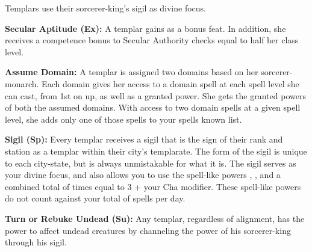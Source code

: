Templars use their sorcerer-king's sigil as divine focus.

\textbf{Secular Aptitude (Ex):} A templar gains  as a bonus feat. In addition, she receives a competence bonus to Secular Authority checks equal to half her class level.

\textbf{Assume Domain:} A templar is assigned two domains based on her sorcerer-monarch. Each domain gives her access to a domain spell at each spell level she can cast, from 1st on up, as well as a granted power. She gets the granted powers of both the assumed domains. With access to two domain spells at a given spell level, she adds only one of those spells to your spells known list.


\textbf{Sigil (Sp):} Every templar receives a sigil that is the sign of their rank and station as a templar within their city's templarate. The form of the sigil is unique to each city-state, but is always unmistakable for what it is. The sigil serves as your divine focus, and also allows you to use the spell-like powers , , and  a combined total of times equal to 3 + your Cha modifier. These spell-like powers do not count against your total of spells per day.

\textbf{Turn or Rebuke Undead (Su):} Any templar, regardless of alignment, has the power to affect undead creatures by channeling the power of his sorcerer-king through his sigil.

